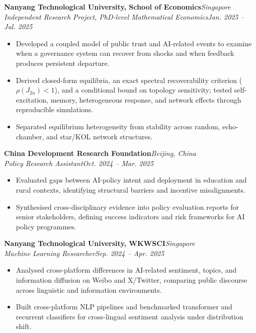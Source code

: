 \documentclass[11pt,a4paper]{article}
\newcommand{\cvheading}[4]{%
  \noindent\textbf{#1}\hfill\textit{#2}\\[-1pt]
  \textit{#3}\hfill\textit{#4}\\[-5pt]
}
\begin{document}
\cvheading{Nanyang Technological University, School of Economics}{Singapore}{Independent Research Project, PhD-level Mathematical Economics}{Jan. 2025 -- Jul. 2025}
\begin{itemize}
  \item Developed a coupled model of public trust and AI-related events to examine when a governance system can recover from shocks and when feedback produces persistent departure.
  \item Derived closed-form equilibria, an exact spectral recoverability criterion ($\rho(J_{2n})<1$), and a conditional bound on topology sensitivity; tested self-excitation, memory, heterogeneous response, and network effects through reproducible simulations.
  \item Separated equilibrium heterogeneity from stability across random, echo-chamber, and star/KOL network structures.
\end{itemize}

\cvheading{China Development Research Foundation}{Beijing, China}{Policy Research Assistant}{Oct. 2024 -- Mar. 2025}
\begin{itemize}
  \item Evaluated gaps between AI-policy intent and deployment in education and rural contexts, identifying structural barriers and incentive misalignments.
  \item Synthesised cross-disciplinary evidence into policy evaluation reports for senior stakeholders, defining success indicators and risk frameworks for AI policy programmes.
\end{itemize}

\cvheading{Nanyang Technological University, WKWSCI}{Singapore}{Machine Learning Researcher}{Sep. 2024 -- Apr. 2025}
\begin{itemize}
  \item Analysed cross-platform differences in AI-related sentiment, topics, and information diffusion on Weibo and X/Twitter, comparing public discourse across linguistic and information environments.
  \item Built cross-platform NLP pipelines and benchmarked transformer and recurrent classifiers for cross-lingual sentiment analysis under distribution shift.
\end{itemize}

\newpage
\end{document}
